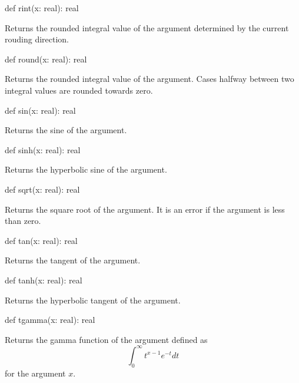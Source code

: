 \begin{protohead}
def rint(x: real): real
\end{protohead}
\begin{protobody}
Returns the rounded integral value of the argument determined by the
current rouding direction.
\end{protobody}

\begin{protohead}
def round(x: real): real
\end{protohead}
\begin{protobody}
Returns the rounded integral value of the argument.  Cases halfway
between two integral values are rounded towards zero.
\end{protobody}

\begin{protohead}
def sin(x: real): real
\end{protohead}
\begin{protobody}
Returns the sine of the argument.
\end{protobody}

\begin{protohead}
def sinh(x: real): real
\end{protohead}
\begin{protobody}
Returns the hyperbolic sine of the argument.
\end{protobody}

\begin{protohead}
def sqrt(x: real): real
\end{protohead}
\begin{protobody}
Returns the square root of the argument.  It is an error if the
argument is less than zero.
\end{protobody}

\begin{protohead}
def tan(x: real): real
\end{protohead}
\begin{protobody}
Returns the tangent of the argument.
\end{protobody}

\begin{protohead}
def tanh(x: real): real
\end{protohead}
\begin{protobody}
Returns the hyperbolic tangent of the argument.
\end{protobody}

\begin{protohead}
def tgamma(x: real): real
\end{protohead}
\begin{protobody}
Returns the gamma function of the argument defined as
$$\int_0^\infty t^{x-1} e^{-t} dt$$
for the argument $x$.
\end{protobody}

